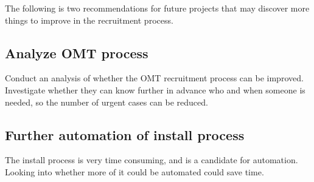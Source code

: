 The following is two recommendations for future projects that may discover more things to improve in the recruitment process.

\subsection{Analyze OMT process}
Conduct an analysis of whether the OMT recruitment process can be improved.
Investigate whether they can know further in advance who and when someone is needed, so the number of urgent cases can be reduced.

\subsection{Further automation of install process}
The install process is very time consuming, and is a candidate for automation.
Looking into whether more of it could be automated could save time.
